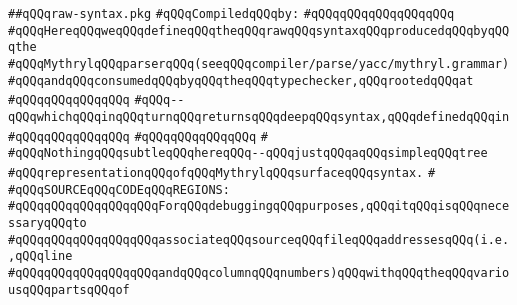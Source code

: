 \label{src/lib/compiler/front/parser/raw-syntax/raw-syntax.pkg}
\verb|##qQQqraw-syntax.pkg|\newline
\newline
\verb|#qQQqCompiledqQQqby:|\newline
\verb|#qQQqqQQqqQQqqQQqqQQq|\newline
\newline
\newline
\newline
\verb|#qQQqHereqQQqweqQQqdefineqQQqtheqQQqrawqQQqsyntaxqQQqproducedqQQqbyqQQqthe|\newline
\verb|#qQQqMythrylqQQqparserqQQq(seeqQQqcompiler/parse/yacc/mythryl.grammar)|\newline
\verb|#qQQqandqQQqconsumedqQQqbyqQQqtheqQQqtypechecker,qQQqrootedqQQqat|\newline
\verb|#qQQqqQQqqQQqqQQq|\newline
\verb|#qQQq--qQQqwhichqQQqinqQQqturnqQQqreturnsqQQqdeepqQQqsyntax,qQQqdefinedqQQqin|\newline
\verb|#qQQqqQQqqQQqqQQq|\newline
\verb|#qQQqqQQqqQQqqQQq|\newline
\verb|#|\newline
\verb|#qQQqNothingqQQqsubtleqQQqhereqQQq--qQQqjustqQQqaqQQqsimpleqQQqtree|\newline
\verb|#qQQqrepresentationqQQqofqQQqMythrylqQQqsurfaceqQQqsyntax.|\newline
\verb|#|\newline
\verb|#qQQqSOURCEqQQqCODEqQQqREGIONS:|\newline
\verb|#qQQqqQQqqQQqqQQqqQQqForqQQqdebuggingqQQqpurposes,qQQqitqQQqisqQQqnecessaryqQQqto|\newline
\verb|#qQQqqQQqqQQqqQQqqQQqassociateqQQqsourceqQQqfileqQQqaddressesqQQq(i.e.,qQQqline|\newline
\verb|#qQQqqQQqqQQqqQQqqQQqandqQQqcolumnqQQqnumbers)qQQqwithqQQqtheqQQqvariousqQQqpartsqQQqof|\newline
